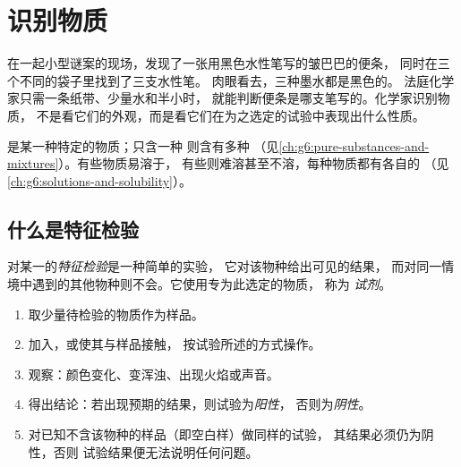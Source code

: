 \chapter{识别物质}\label{ch:g7:identifying-substances}

在一起小型谜案的现场，发现了一张用黑色水性笔写的皱巴巴的便条，
同时在三个不同的袋子里找到了三支水性笔。
肉眼看去，三种墨水都是黑色的。
法庭化学家只需一条纸带、少量水和半小时，
就能判断便条是哪支笔写的。化学家识别物质，
不是看它们的外观，而是看它们在为之选定的试验中表现出什么性质。

\begin{recall}
是某一种特定的物质；只含一种
则含有多种
（见\cref{ch:g6:pure-substances-and-mixtures}）。有些物质易溶于，
有些则难溶甚至不溶，每种物质都有各自的
（见\cref{ch:g6:solutions-and-solubility}）。
\end{recall}

\section{什么是特征检验}

\begin{definition}[特征检验与试剂]\label{def:g7:identifying-substances:characteristic-test}
对某一的\emph{特征检验}是一种简单的实验，
它对该物种给出可见的结果，
而对同一情境中遇到的其他物种则不会。它使用专为此选定的物质，
称为
\emph{试剂}。
\end{definition}


\begin{method}[进行特征检验]\label{met:g7:identifying-substances:run}
\begin{enumerate}
  \item 取少量待检验的物质作为样品。
  \item 加入，或使其与样品接触，
        按试验所述的方式操作。
  \item 观察：颜色变化、变浑浊、出现火焰或声音。
  \item 得出结论：若出现预期的结果，则试验为\emph{阳性}，
        否则为\emph{阴性}。
  \item 对已知不含该物种的样品（即空白样）做同样的试验，
        其结果必须仍为阴性，否则
        试验结果便无法说明任何问题。
\end{enumerate}
\end{method}

